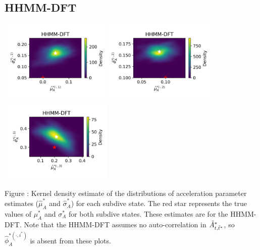 \documentclass{article}
\begin{document}
        \subsection{HHMM-DFT}
        \begin{center}
        \includegraphics[width=2.1in]{../Plots/hhmm_FV_uncorr_MLE_density_A_0_0.png}
        \includegraphics[width=2.1in]{../Plots/hhmm_FV_uncorr_MLE_density_A_0_1.png}
        \includegraphics[width=2.1in]{../Plots/hhmm_FV_uncorr_MLE_density_A_0_2.png}
        \end{center}
        
        \noindent Figure : Kernel density estimate of the distributions of acceleration parameter estimates ($\hat \mu^*_A$ and $\hat \sigma^*_A$) for each subdive state. The red star represents the true values of $\mu^*_A$ and $\sigma^*_A$ for both subdive states. These estimates are for the HHMM-DFT. Note that the HHMM-DFT assumes no auto-correlation in $\tilde{A}^*_{t,\tilde t^*}$, so $\hat \phi_A^{*(\cdot,i^*)}$ is absent from these plots.
        \addtocounter{fignum}{1}
        
\end{document}
